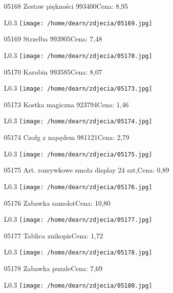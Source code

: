 05168 Zestaw piękności 993400Cena: 8,95\newline
\begin{wrapfigure}{L}{0.3\textwidth}
\texttt{[image: /home/dearn/zdjecia/05169.jpg]}
\end{wrapfigure}
05169 Strzelba 993905Cena: 7,48\newline
\begin{wrapfigure}{L}{0.3\textwidth}
\texttt{[image: /home/dearn/zdjecia/05170.jpg]}
\end{wrapfigure}
05170 Karabin 993585Cena: 8,07\newline
\begin{wrapfigure}{L}{0.3\textwidth}
\texttt{[image: /home/dearn/zdjecia/05173.jpg]}
\end{wrapfigure}
05173 Kostka magiczna 923794Cena: 1,46\newline
\begin{wrapfigure}{L}{0.3\textwidth}
\texttt{[image: /home/dearn/zdjecia/05174.jpg]}
\end{wrapfigure}
05174 Czołg z napędem 981121Cena: 2,79\newline
\begin{wrapfigure}{L}{0.3\textwidth}
\texttt{[image: /home/dearn/zdjecia/05175.jpg]}
\end{wrapfigure}
05175 Art. rozrywkowe smoła display 24 szt,Cena: 0,89\newline
\begin{wrapfigure}{L}{0.3\textwidth}
\texttt{[image: /home/dearn/zdjecia/05176.jpg]}
\end{wrapfigure}
05176 Zabawka samolotCena: 10,80\newline
\begin{wrapfigure}{L}{0.3\textwidth}
\texttt{[image: /home/dearn/zdjecia/05177.jpg]}
\end{wrapfigure}
05177 Tablica znikopisCena: 1,72\newline
\begin{wrapfigure}{L}{0.3\textwidth}
\texttt{[image: /home/dearn/zdjecia/05178.jpg]}
\end{wrapfigure}
05178 Zabawka puzzleCena: 7,69\newline
\begin{wrapfigure}{L}{0.3\textwidth}
\texttt{[image: /home/dearn/zdjecia/05180.jpg]}
\end{wrapfigure}
